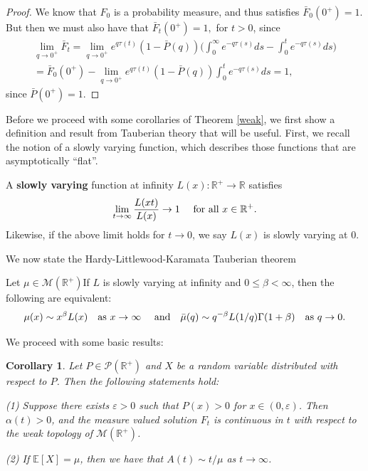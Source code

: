 \begin{proof}
We know that $F_0$ is a probability measure, and thus satisfies $\bar F_0(0^+) = 1$.  But then we must also have that $\bar F_t(0^+) = 1,$ for $t>0$, since
\begin{eqnarray}
\lim_{q \rightarrow 0^+}\bar F_t = \lim_{q \rightarrow 0^+} e^{q\tau^{}(t)}(1-\bar P(q))\Big (\int_0^\infty e^{-q\tau ^{}(s)}ds-\int_0^t e^{-q\tau ^{}(s)}ds \Big) \\
 =  \bar F_0(0^+)-\lim_{q \rightarrow 0^+}e^{q\tau^{}(t)}(1- \bar P(q))\int_0^t e^{-q\tau ^{}(s)}ds = 1, \label{equi2}\nonumber
\end{eqnarray} 
since $\bar P(0^+) =1$.    

\end{proof}

Before we proceed with some corollaries of Theorem \ref{weak}, we first show a definition and result from Tauberian theory that  will be useful. First, we recall the notion of a slowly varying function, which describes those functions that are asymptotically ``flat''.


\begin{deef}
A \textbf{slowly varying} function at infinity $L(x): \mathbb{R}^+ \rightarrow \mathbb{R}$  satisfies 
 \begin{equation}
 \lim_{t\rightarrow \infty} \frac{L(xt)}{L(x)} \rightarrow 1   \quad \hbox{ for all } x \in \mathbb{R}^+.    
 \end{equation}
 Likewise, if the above limit holds for $t \rightarrow 0$, we say $L(x)$ is slowly varying at 0.
\end{deef}

We now state the Hardy-Littlewood-Karamata Tauberian theorem \cite{feller1974introduction}


\begin{lem}\label{taub} Let $\mu \in \mathcal M(\mathbb{R}^+)$If $L$ is slowly varying at infinity and $0\le \beta <\infty$, then the following are equivalent:
        \begin{equation}
\mu(x) \sim x^\beta L(x) \quad \hbox{as } x\rightarrow \infty \quad \hbox{ and} \quad \bar \mu (q) \sim q^{-\beta}L(1/q)\Gamma(1+\beta) \quad  \hbox{as } q\rightarrow 0 .
\end{equation}
\end{lem} 



We proceed with some basic results:

\newtheorem{cor}{Corollary}

\begin{cor}\label{cor1} Let $P \in \mathcal P(\mathbb R ^+)$ and $X$ be a random variable distributed with respect to $P$. Then the following statements hold:

(1) Suppose there exists $\varepsilon> 0$ such that $P(x)>0$  for $x \in (0, \varepsilon)$.  Then $\alpha(t)>0$, and the measure valued solution $F_t$ is continuous in $t$ with respect to the weak topology of $\mathcal M(\mathbb{R}^+)$.

(2) If $\mathbb E[X] = \mu$, then we have that $A(t) \sim t/\mu $ as $t \rightarrow \infty$.
\end{cor}

